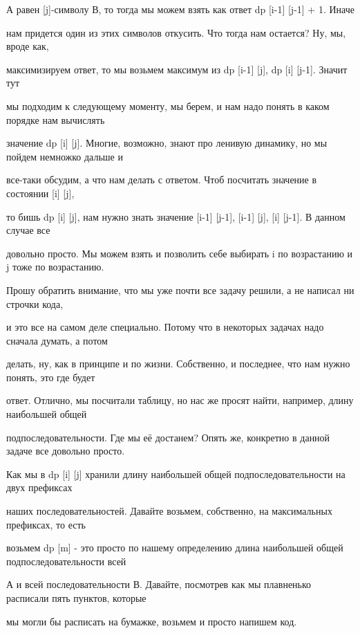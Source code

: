 \documentclass{article}
\begin{document}
А равен [j]-символу В, то тогда мы можем 
взять как ответ dp [i-1] [j-1] + 1. Иначе  

нам придется один из этих символов откусить. 
Что тогда нам остается? Ну, мы, вроде как,  

максимизируем ответ, то мы возьмем максимум 
из dp [i-1] [j], dp [i] [j-1]. Значит тут  

мы подходим к следующему моменту, мы берем, и 
нам надо понять в каком порядке нам вычислять 

значение dp [i] [j]. Многие, возможно, знают про 
ленивую динамику, но мы пойдем немножко дальше и  

все-таки обсудим, а что нам делать с ответом. 
Чтоб посчитать значение в состоянии [i] [j],  

то бишь dp [i] [j], нам нужно знать значение [i-1] 
[j-1], [i-1] [j], [i] [j-1]. В данном случае все  

довольно просто. Мы можем взять и позволить себе 
выбирать i по возрастанию и j тоже по возрастанию.  

Прошу обратить внимание, что мы уже почти все 
задачу решили, а не написал ни строчки кода,  

и это все на самом деле специально. Потому что 
в некоторых задачах надо сначала думать, а потом  

делать, ну, как в принципе и по жизни. Собственно, 
и последнее, что нам нужно понять, это где будет  

ответ. Отлично, мы посчитали таблицу, но нас же 
просят найти, например, длину наибольшей общей  

подпоследовательности. Где мы её достанем? Опять 
же, конкретно в данной задаче все довольно просто.  

Как мы в dp [i] [j] хранили длину наибольшей 
общей подпоследовательности на двух префиксах  

наших последовательностей. Давайте возьмем, 
собственно, на максимальных префиксах, то есть  

возьмем dp [m] - это просто по нашему определению 
длина наибольшей общей подпоследовательности всей  

А и всей последовательности В. Давайте, посмотрев 
как мы плавненько расписали пять пунктов, которые  

мы могли бы расписать на бумажке, возьмем и просто 
напишем код.
\end{document}
